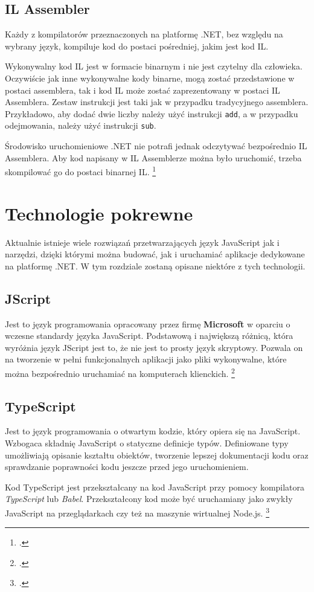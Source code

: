 \subsection{IL Assembler}
\par Każdy z kompilatorów przeznaczonych na platformę .NET, bez względu na wybrany język, kompiluje kod do postaci pośredniej, jakim jest kod IL.
\par Wykonywalny kod IL jest w formacie binarnym i nie jest czytelny dla człowieka. Oczywiście jak inne wykonywalne kody binarne, mogą zostać przedstawione w postaci assemblera, tak i kod IL może zostać zaprezentowany w postaci IL Assemblera. Zestaw instrukcji jest taki jak w przypadku tradycyjnego assemblera. Przykładowo, aby dodać dwie liczby należy użyć instrukcji \texttt{add}, a w przypadku odejmowania, należy użyć instrukcji \texttt{sub}.
\par Środowisko uruchomieniowe .NET nie potrafi jednak odczytywać bezpośrednio IL Assemblera. Aby kod napisany w IL Assemblerze można było uruchomić, trzeba skompilować go do postaci binarnej IL. \footcite{ILAsm1}

\section{Technologie pokrewne}
Aktualnie istnieje wiele rozwiązań przetwarzających język JavaScript jak i narzędzi, dzięki którymi można budować, jak i uruchamiać aplikacje dedykowane na platformę .NET. W tym rozdziale zostaną opisane niektóre z tych technologii.

\subsection{JScript}
\par Jest to język programowania opracowany przez firmę \textbf{Microsoft} w oparciu o wczesne standardy języka JavaScript. Podstawową i największą różnicą, która wyróżnia język JScript jest to, że nie jest to prosty język skryptowy. Pozwala on na tworzenie w pełni funkcjonalnych aplikacji jako pliki wykonywalne, które można bezpośrednio uruchamiać na komputerach klienckich. \footcite{jscript}

\subsection{TypeScript}
\par Jest to język programowania o otwartym kodzie, który opiera się na JavaScript. Wzbogaca składnię JavaScript o statyczne definicje typów. Definiowane typy umożliwiają opisanie kształtu obiektów, tworzenie lepszej dokumentacji kodu oraz sprawdzanie poprawności kodu jeszcze przed jego uruchomieniem. 
\par Kod TypeScript jest przekształcany na kod JavaScript przy pomocy kompilatora \textit{TypeScript} lub \textit{Babel}. Przekształcony kod może być uruchamiany jako zwykły JavaScript na przeglądarkach czy też na maszynie wirtualnej Node.js. \footcite{typescript}

